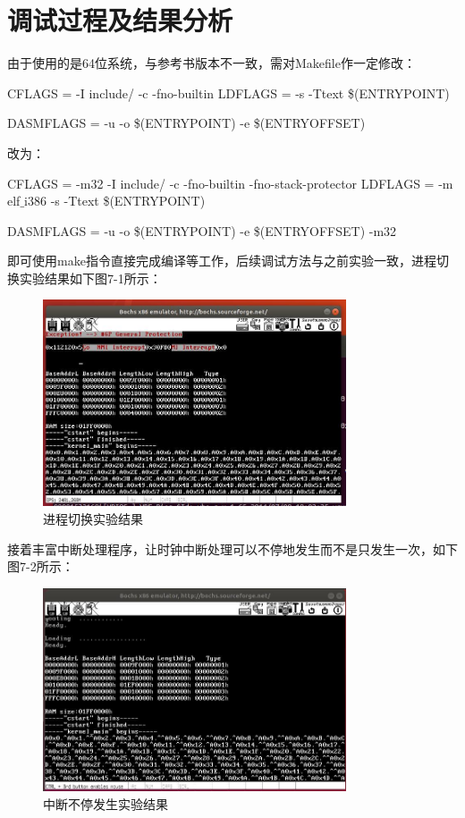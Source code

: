 \section{调试过程及结果分析}
由于使用的是64位系统，与参考书版本不一致，需对Makefile作一定修改：\par
CFLAGS	= -I include/ -c -fno-builtin LDFLAGS	= -s -Ttext \$(ENTRYPOINT)\par
DASMFLAGS	= -u -o \$(ENTRYPOINT) -e \$(ENTRYOFFSET)\par
改为：\par
CFLAGS	= -m32 -I include/ -c -fno-builtin -fno-stack-protector LDFLAGS	= -m elf$\_$i386 -s -Ttext \$(ENTRYPOINT)\par
DASMFLAGS	= -u -o \$(ENTRYPOINT) -e \$(ENTRYOFFSET) -m32\par
即可使用make指令直接完成编译等工作，后续调试方法与之前实验一致，进程切换实验结果如下图7-1所示：
\begin{figure}[H]
  \centering
  \includegraphics[width=0.8\textwidth]{figures/chapter7/7-1.jpg}
  \caption{进程切换实验结果}
  \label{fig:1}
\end{figure}

接着丰富中断处理程序，让时钟中断处理可以不停地发生而不是只发生一次，如下图7-2所示：
\begin{figure}[H]
  \centering
  \includegraphics[width=0.8\textwidth]{figures/chapter7/7-2.jpg}
  \caption{中断不停发生实验结果}
  \label{fig:2}
\end{figure}

